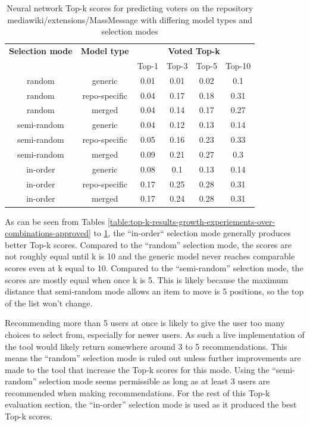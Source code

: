 \begin{table}[H]
    \centering
    \begin{tabular}{@{}c c c c c c@{}} 
 \hline
    \textbf{Selection mode} & \textbf{Model type} &
    \multicolumn{4}{c}{\textbf{Voted Top-k}} \\
      & & {Top-1} & {Top-3} & {Top-5} & {Top-10} \\
\hline
random & generic & 0.01 & 0.01 & 0.02 & 0.1 \\
random & repo-specific & 0.04 & 0.17 & 0.18 & 0.31 \\
random & merged & 0.04 & 0.14 & 0.17 & 0.27 \\
\hline
semi-random & generic & 0.04 & 0.12 & 0.13 & 0.14 \\
semi-random & repo-specific & 0.05 & 0.16 & 0.23 & 0.33 \\
semi-random & merged & 0.09 & 0.21 & 0.27 & 0.3 \\
\hline
in-order & generic & 0.08 & 0.1 & 0.13 & 0.14 \\
in-order & repo-specific & 0.17 & 0.25 & 0.28 & 0.31 \\
in-order & merged & 0.17 & 0.24 & 0.28 & 0.31 \\
\hline
\end{tabular}
    \caption{Neural network Top-k scores for predicting voters on the repository mediawiki/extensions/MassMessage with differing model types and selection modes}
    \label{table:top-k-results-mass-message-over-combinations-voted}
\end{table}

As can be seen from Tables \ref{table:top-k-results-growth-experiements-over-combinations-approved} to \ref{table:top-k-results-mass-message-over-combinations-voted}, the ``in-order`` selection mode generally produces better Top-k scores. Compared to the ``random'' selection mode, the scores are not roughly equal until k is 10 and the generic model never reaches comparable scores even at k equal to 10. Compared to the ``semi-random'' selection mode, the scores are mostly equal when once k is 5. This is likely because the maximum distance that semi-random mode allows an item to move is 5 positions, so the top of the list won't change.

\label{para:use-in-order-for-neural-network}Recommending more than 5 users at once is likely to give the user too many choices to select from, especially for newer users. As such a live implementation of the tool would likely return somewhere around 3 to 5 recommendations. This means the ``random'' selection mode is ruled out unless further improvements are made to the tool that increase the Top-k scores for this mode. Using the ``semi-random'' selection mode seems permissible as long as at least 3 users are recommended when making recommendations. For the rest of this Top-k evaluation section, the ``in-order'' selection mode is used as it produced the best Top-k scores.


